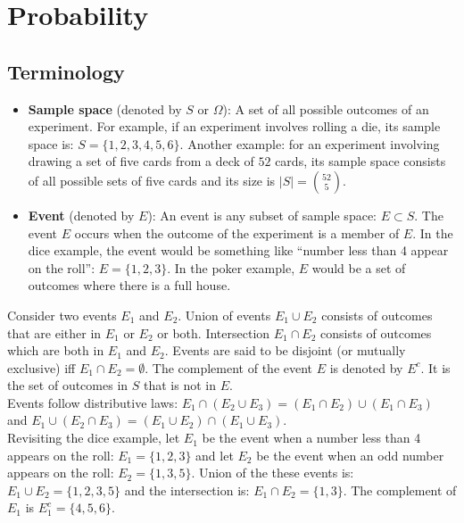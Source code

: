 \documentclass[12pt, a4paper]{article}
\newcounter{exa}
\begin{document}
\section{Probability}

\subsection{Terminology}

\begin{itemize}
  \item \textbf{Sample space} (denoted by $S$ or $\Omega$): A set of all possible outcomes of an experiment. For example, if an experiment involves rolling a die, its sample space is: $S=\{1, 2, 3, 4, 5, 6\}$. Another example: for an experiment involving drawing a set of five cards from a deck of $52$ cards, its sample space consists of all possible sets of five cards and its size is $|S|=\binom{52}{5}$.
  \item \textbf{Event} (denoted by $E$): An event is any subset of sample space: $E \subset S$. The event $E$ occurs when the outcome of the experiment is a member of $E$. In the dice example, the event would be something like ``number less than 4 appear on the roll'': $E=\{1, 2, 3\}$. In the poker example, $E$ would be a set of outcomes where there is a full house.
\end{itemize}

Consider two events $E_1$ and $E_2$. Union of events $E_1 \cup E_2$ consists of outcomes that are either in $E_1$ or $E_2$ or both. Intersection $E_1 \cap E_2$ consists of outcomes which are both in $E_1$ and $E_2$. Events are said to be disjoint (or mutually exclusive) iff $E_1 \cap E_2 = \emptyset$. The complement of the event $E$ is denoted by $E^c$. It is the set of outcomes in $S$ that is not in $E$. \\

Events follow distributive laws: $E_1 \cap (E_2 \cup E_3) = (E_1 \cap E_2) \cup (E_1 \cap E_3)$ and $E_1 \cup (E_2 \cap E_3) = (E_1 \cup E_2) \cap (E_1 \cup E_3)$. \\

Revisiting the dice example, let $E_1$ be the event when a number less than 4 appears on the roll: $E_1=\{1, 2, 3\}$ and let $E_2$ be the event when an odd number appears on the roll: $E_2=\{1, 3, 5\}$. Union of the these events is: $E_1 \cup E_2 = \{1, 2, 3, 5\}$ and the intersection is: $E_1 \cap E_2 = \{1, 3\}$. The complement of $E_1$ is $E_1^c=\{4, 5, 6\}$.
\end{document}
